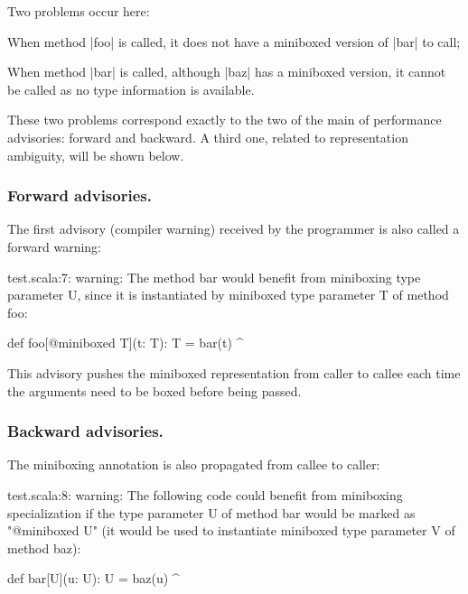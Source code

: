 Two problems occur here:

\begin{compactitem}
 \item When method |foo| is called, it does not have a miniboxed version of |bar| to call;
 \item When method |bar| is called, although |baz| has a miniboxed version, it cannot be called as no type information is available.
\end{compactitem}

These two problems correspond exactly to the two of the main of performance advisories: forward and backward. A third one, related to representation ambiguity, will be shown below.

\subsubsection{Forward advisories.} The first advisory (compiler warning) received by the programmer is also called a forward warning:

\begin{lstlisting-nobreak-nolang}
test.scala:7: warning: The method bar would benefit from miniboxing type parameter U, since it is instantiated by miniboxed type parameter T of method foo:

       def foo[@miniboxed T](t: T): T = bar(t)
                                                   ^
\end{lstlisting-nobreak-nolang}

This advisory pushes the miniboxed representation from caller to callee each time the arguments need to be boxed before being passed.

\subsubsection{Backward advisories.} The miniboxing annotation is also propagated from callee to caller:

\begin{lstlisting-nobreak-nolang}
test.scala:8: warning: The following code could benefit from miniboxing specialization if the type parameter U of method bar would be marked as "@miniboxed U" (it would be used to instantiate miniboxed type parameter V of method baz):

        def bar[U](u: U): U = baz(u)
                                     ^
\end{lstlisting-nobreak-nolang}

